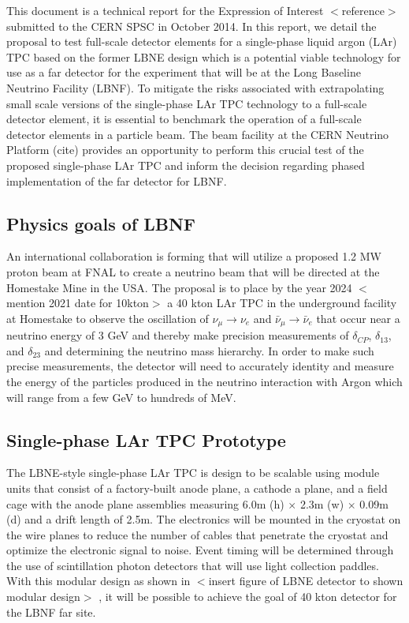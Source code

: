 This document is a technical report for the Expression of Interest $<$reference$>$ submitted to the CERN SPSC in October 2014.  In this report, we detail the 
proposal to test full-scale detector elements for a single-phase liquid argon (LAr) TPC based on the former LBNE design which is a potential viable technology 
for use as a far detector for the experiment that will be at the Long Baseline Neutrino Facility (LBNF).  To mitigate the risks associated with extrapolating 
small scale versions of the single-phase LAr TPC technology to a full-scale detector element, it is essential to benchmark the operation of a full-scale 
detector elements in a particle beam.  The beam facility at the CERN Neutrino Platform (cite) provides an opportunity to perform this crucial test of the 
proposed single-phase LAr TPC and inform the decision regarding phased implementation of the far detector for LBNF.


\subsection{Physics goals of LBNF}
An international collaboration is forming that will utilize a proposed 1.2 MW proton beam at FNAL to create a neutrino beam that will be directed at the 
Homestake Mine in the USA.  The proposal is to place by the year 2024 $<$mention 2021 date for 10kton$>$ a 40 kton LAr TPC in the underground facility at 
Homestake to observe the oscillation of $\nu_\mu \rightarrow \nu_e$ and $\bar{\nu}_\mu \rightarrow \bar{\nu}_e$ that occur near a neutrino energy of 3 GeV 
and thereby make precision measurements of $\delta_{CP}$, $\delta_{13}$, and $\delta_{23}$ and determining the neutrino mass hierarchy.  In order to make such 
precise measurements, the detector will need to accurately identity and measure the energy of the particles produced in the neutrino interaction with Argon 
which will range from a few GeV to hundreds of MeV.       


\subsection{Single-phase LAr TPC Prototype}
The LBNE-style single-phase LAr TPC is design to be scalable using module units that consist of a factory-built anode plane, a cathode a plane, and a field 
cage with the anode plane assemblies measuring 6.0m  (h)  $\times$  2.3m  (w) $\times$  0.09m (d) and a drift length of 2.5m.  The electronics will be mounted 
in the cryostat on the wire planes to reduce the number of cables that penetrate the cryostat and optimize the electronic signal to noise.  Event timing will 
be determined through the use of scintillation photon detectors that will use light collection paddles.  With this modular design as shown in $<$insert figure 
of LBNE detector to shown modular design$>$ , it will be possible to achieve the goal of 40 kton detector for the LBNF far site.

